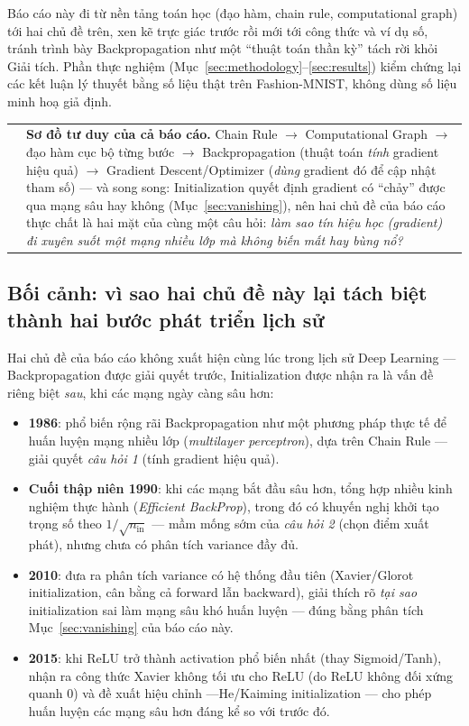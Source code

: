 \documentclass[12pt,a4paper]{article}
\makeatletter
\newenvironment{tructiep}[1][Cách hiểu đơn giản]
  {\par\smallskip\noindent\begin{tabular}{@{}p{0.35em}@{\hspace{6pt}}p{\dimexpr\linewidth-1.9em\relax}@{}}
   \textcolor{boxln}{\rule{2pt}{\baselineskip}} & \textbf{#1.}\enspace\ignorespaces}
  {\end{tabular}\par\smallskip}
\newcommand{\en}[1]{\textit{#1}}
\makeatother
\begin{document}
Báo cáo này đi từ nền tảng toán học (đạo hàm, chain rule, computational
graph) tới hai chủ đề trên, xen kẽ trực giác trước rồi mới tới công thức và
ví dụ số, tránh trình bày Backpropagation như một ``thuật toán thần kỳ''
tách rời khỏi Giải tích. Phần thực nghiệm (Mục~\ref{sec:methodology}--\ref{sec:results})
kiểm chứng lại các kết luận lý thuyết bằng số liệu thật trên Fashion-MNIST,
không dùng số liệu minh hoạ giả định.

\begin{tructiep}[Sơ đồ tư duy của cả báo cáo]
Chain Rule $\to$ Computational Graph $\to$ đạo hàm cục bộ từng bước $\to$
Backpropagation (thuật toán \emph{tính} gradient hiệu quả) $\to$ Gradient
Descent/Optimizer (\emph{dùng} gradient đó để cập nhật tham số) --- và song
song: Initialization quyết định gradient có ``chảy'' được qua mạng sâu hay
không (Mục~\ref{sec:vanishing}), nên hai chủ đề của báo cáo thực chất là
hai mặt của cùng một câu hỏi: \emph{làm sao tín hiệu học (gradient) đi
xuyên suốt một mạng nhiều lớp mà không biến mất hay bùng nổ?}
\end{tructiep}

\subsection*{Bối cảnh: vì sao hai chủ đề này lại tách biệt thành hai bước
phát triển lịch sử}

Hai chủ đề của báo cáo không xuất hiện cùng lúc trong lịch sử Deep
Learning --- Backpropagation được giải quyết trước, Initialization được
nhận ra là vấn đề riêng biệt \emph{sau}, khi các mạng ngày càng sâu hơn:

\begin{itemize}
\item \textbf{1986}: \citet{rumelhart1986learning} phổ biến rộng rãi
  Backpropagation như một phương pháp thực tế để huấn luyện mạng nhiều
  lớp (\en{multilayer perceptron}), dựa trên Chain Rule --- giải quyết
  \emph{câu hỏi 1} (tính gradient hiệu quả).
\item \textbf{Cuối thập niên 1990}: khi các mạng bắt đầu sâu hơn,
  \citet{lecun1998efficient} tổng hợp nhiều kinh nghiệm thực hành
  (\en{Efficient BackProp}), trong đó có khuyến nghị khởi tạo trọng số
  theo $1/\sqrt{n_{\text{in}}}$ --- mầm mống sớm của \emph{câu hỏi 2}
  (chọn điểm xuất phát), nhưng chưa có phân tích variance đầy đủ.
\item \textbf{2010}: \citet{glorot2010understanding} đưa ra phân tích
  variance có hệ thống đầu tiên (Xavier/Glorot initialization, cân bằng
  cả forward lẫn backward), giải thích rõ \emph{tại sao} initialization
  sai làm mạng sâu khó huấn luyện --- đúng bằng phân tích
  Mục~\ref{sec:vanishing} của báo cáo này.
\item \textbf{2015}: khi ReLU trở thành activation phổ biến nhất (thay
  Sigmoid/Tanh), \citet{he2015delving} nhận ra công thức Xavier không tối
  ưu cho ReLU (do ReLU không đối xứng quanh $0$) và đề xuất hiệu chỉnh
  ---He/Kaiming initialization --- cho phép huấn luyện các mạng sâu hơn
  đáng kể so với trước đó.
\end{itemize}
\end{document}
